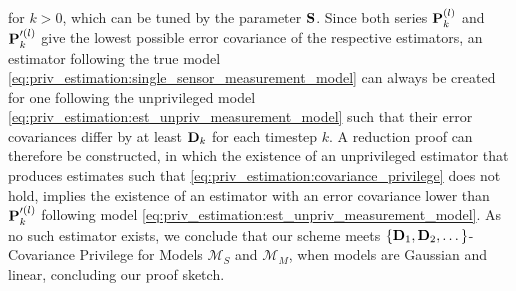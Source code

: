 for $k>0$, which can be tuned by the parameter ${{\mathbf{S}}}$. Since both series ${{\mathbf{P}}}_k^{(l)}$ and ${{\mathbf{P}}}_k^{\prime(l)}$ give the lowest possible error covariance of the respective estimators, an estimator following the true model \eqref{eq:priv_estimation:single_sensor_measurement_model} can always be created for one following the unprivileged model \eqref{eq:priv_estimation:est_unpriv_measurement_model} such that their error covariances differ by at least ${{\mathbf{D}}}_k$ for each timestep $k$. A reduction proof can therefore be constructed, in which the existence of an unprivileged estimator that produces estimates such that \eqref{eq:priv_estimation:covariance_privilege} does not hold, implies the existence of an estimator with an error covariance lower than ${{\mathbf{P}}}_k^{\prime(l)}$ following model \eqref{eq:priv_estimation:est_unpriv_measurement_model}. As no such estimator exists, we conclude that our scheme meets $\{{{\mathbf{D}}}_1,{{\mathbf{D}}}_2,\dots\}$-Covariance Privilege for Models $\mathcal{M}_S$ and $\mathcal{M}_M$, when models are Gaussian and linear, concluding our proof sketch.

% 
% 

